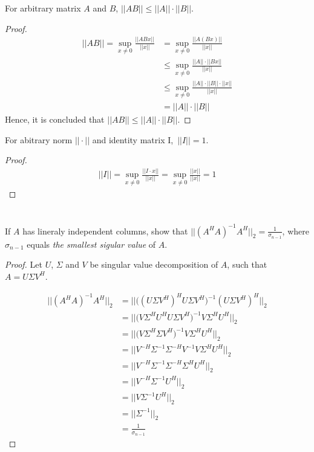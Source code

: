 \documentclass[11pt,a4paper]{article}
\begin{document}
\begin{lemma}
    For arbitrary matrix $A$ and $B$, $|| AB || \leq || A || \cdot || B ||$.
\end{lemma}
\begin{proof}
    \begin{align}
        || A B || = \sup_{x \not =0} \frac{|| A B x ||}{|| x ||} 
        &= \sup_{x \not =0} \frac{|| A (B x) ||}{|| x ||} \\ 
        &\leq \sup_{x \not =0} \frac{|| A || \cdot || B x ||}{|| x ||} \\
        &\leq \sup_{x \not =0} \frac{|| A || \cdot || B || \cdot || x || }{|| x ||} \\
        &= || A || \cdot || B || 
\end{align}
Hence, it is concluded that $|| A B || \leq || A || \cdot || B ||$.
\end{proof}

\begin{lemma}
    For abitrary norm $|| \cdot ||$ and identity matrix I,\ $|| I || = 1$.
\end{lemma}
\begin{proof}
    \begin{align}
        || I || = \sup_{x\not =0} \frac{|| I \cdot x ||}{|| x ||} 
        = \sup_{x\not =0} \frac{|| x ||}{|| x ||} 
        = 1
    \end{align}
\end{proof}

\newpage
\section{}
If $A$ has lineraly independent columns, show that 
$|| (A^H A)^{-1} A^H ||_2 = \frac{1}{\sigma_{n-1}}$, where $\sigma_{n-1}$
equals {\it the smallest sigular value} of $A$. 

\begin{proof}
    Let $U$, $\Sigma$ and $V$ be singular value decomposition of $A$, such
    that $A = U\Sigma V^H$.

    \begin{align}
         || (A^H A)^{-1} A^H ||_2 
        &= || \big( (U\Sigma V^H)^H U\Sigma V^H \big)^{-1} (U\Sigma V^H)^H ||_2 \\
        &= || \big( V \Sigma^H U^H U\Sigma V^H \big)^{-1} V \Sigma^H U^H ||_2 \\
        &= || \big( V \Sigma^H \Sigma V^H \big)^{-1} V \Sigma^H U^H ||_2 \\
        &= || V^{-H} \Sigma^{-1} \Sigma^{-H} V^{-1}  V \Sigma^H U^H ||_2 \\
        &= || V^{-H} \Sigma^{-1} \Sigma^{-H} \Sigma^H U^H ||_2 \\
        &= || V^{-H} \Sigma^{-1} U^H ||_2 \\
        &= || V \Sigma^{-1} U^H ||_2 \\
        &= || \Sigma^{-1}||_2 \\
        &= \frac{1}{\sigma_{n-1}}
    \end{align}
\end{proof}
\end{document}
